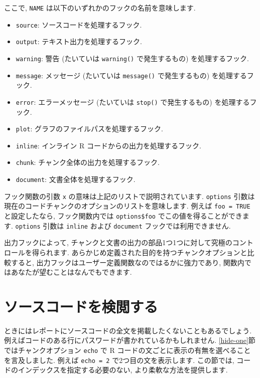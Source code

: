 \documentclass[
  11pt,
  lualatex,ja=standard,jafont=noto]{bxjsreport}
\begin{document}
ここで, \texttt{NAME} は以下のいずれかのフックの名前を意味します.

\begin{itemize}
\item
  \texttt{source}: ソースコードを処理するフック.
\item
  \texttt{output}: テキスト出力を処理するフック.
\item
  \texttt{warning}: 警告 (たいていは \texttt{warning()} で発生するもの) を処理するフック.
\item
  \texttt{message}: メッセージ (たいていは \texttt{message()} で発生するもの) を処理するフック.
\item
  \texttt{error}: エラーメッセージ (たいていは \texttt{stop()} で発生するもの) を処理するフック.
\item
  \texttt{plot}: グラフのファイルパスを処理するフック.
\item
  \texttt{inline}: インライン R コードからの出力を処理するフック.
\item
  \texttt{chunk}: チャンク全体の出力を処理するフック.
\item
  \texttt{document}: 文書全体を処理するフック.
\end{itemize}

フック関数の引数 \texttt{x} の意味は上記のリストで説明されています. \texttt{options} 引数は現在のコードチャンクのオプションのリストを意味します. 例えば \texttt{foo = TRUE} と設定したなら, フック関数内では \texttt{options\$foo} でこの値を得ることができます. \texttt{options} 引数は \texttt{inline} および \texttt{document} フックでは利用できません.

出力フックによって, チャンクと文書の出力の部品1つ1つに対して究極のコントロールを得られます. あらかじめ定義された目的を持つチャンクオプションと比較すると, 出力フックはユーザー定義関数なのではるかに強力であり, 関数内ではあなたが望むことはなんでもできます.

\hypertarget{hook-hide}{%
\section{ソースコードを検閲する}\label{hook-hide}}

ときにはレポートにソースコードの全文を掲載したくないこともあるでしょう. 例えばコードのある行にパスワードが書かれているかもしれません. \ref{hide-one}節ではチャンクオプション \texttt{echo} で R コードの文ごとに表示の有無を選べることを言及しました. 例えば \texttt{echo = 2} で2つ目の文を表示します. この節では, コードのインデックスを指定する必要のない, より柔軟な方法を提供します.
\end{document}
